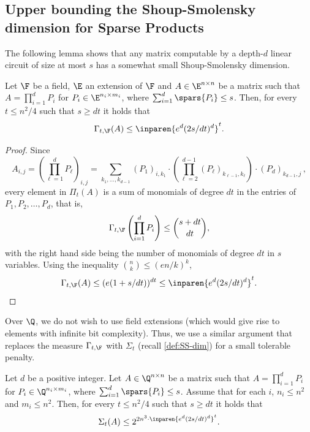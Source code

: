 \subsection{Upper bounding the Shoup-Smolensky dimension for Sparse Products}

\label{sec:SS-dim}
The following lemma shows that any matrix computable by a depth-$d$ linear circuit of size at most $s$ has a somewhat small Shoup-Smolensky dimension. 

\begin{lemma}\label{lem:ss-easy-ub-large-depth}
Let $\F$ be a field, $\E$ an extension of $\F$ and $A \in \E^{n \times n}$ be a matrix such that $A = \prod_{i = 1}^d P_i$ for $P_i \in \E^{n_i \times m_i}$, where $\sum_{i = 1}^d\spars{P_i} \leq s$. Then, for every $t\le n^2/4$ such that $s \ge dt$ it holds that
\[
\Gamma_{t, \F}(A) \le \inparen{e^d (2s/dt)^d}^t.
\]
\end{lemma}
\begin{proof}
Since 
$$A_{i,j} = \left(\prod_{\ell = 1}^d P_{\ell}\right)_{i,j} = \sum_{k_1, \ldots, k_{d-1}} (P_1)_{i, k_1}\cdot \left(\prod_{\ell = 2}^{d-1} (P_{\ell})_{k_{\ell-1}, k_{\ell}} \right) \cdot (P_{d})_{k_{d-1}, j}\, , $$
every element in $\Pi_{t} (A)$ is a sum of monomials of degree $dt$ in the entries of $P_1, P_2, \ldots, P_d$, that is,
\[
\Gamma_{t, \F}\left(\prod_{i = 1}^d P_i\right) \leq \binom{s + dt}{dt},
\]
with the right hand side being the number of monomials of degree $dt$ in $s$ variables.
Using the inequality $\binom{n}{k} \le (en/k)^k$,
\[
\Gamma_{t, \F}(A) \leq (e(1 + s/dt))^{dt} \le \inparen{e^d (2s/dt)^d}^t. \qedhere
\]
\end{proof}


Over $\Q$, we do not wish to use field extensions (which would give rise to elements with infinite bit complexity). Thus, we use a similar argument that replaces the measure $\Gamma_{t,\F}$ with $\Sigma_{t}$ (recall \autoref{def:SS-dim}) for a small tolerable penalty.
\begin{lemma}
\label{lem:ss-up-sigma}
Let $d$ be a positive integer. Let $A \in \Q^{n \times n}$ be a matrix such that $A = \prod_{i = 1}^d P_i$ for $P_i \in \Q^{n_i \times m_i}$, where $\sum_{i = 1}^d\spars{P_i} \leq s $. Assume that for each $i$,  $n_i \leq n^2$ and $m_i \leq n^2$. Then, for every $t\le n^2/4$ such that $s \ge dt$ it holds that
\[
\Sigma_{t}(A) \le 2^{2n^3\cdot \inparen{e^d (2s/dt)^d}^t}.
\]

\end{lemma}

